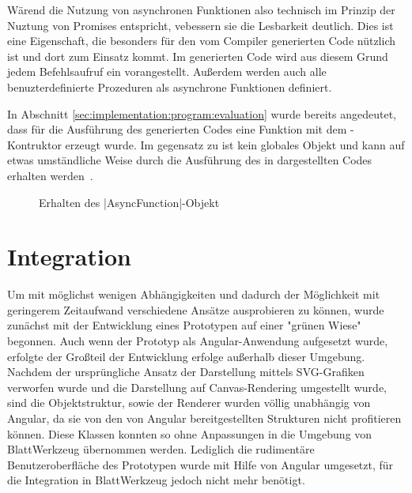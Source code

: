 Wärend die Nutzung von asynchronen Funktionen also technisch im Prinzip der Nuztung von Promises entspricht, vebessern sie die Lesbarkeit deutlich. Dies ist eine Eigenschaft, die besonders für den vom Compiler generierten Code  nützlich ist und dort zum Einsatz kommt. Im generierten Code wird aus diesem Grund jedem Befehlsaufruf ein  vorangestellt. Außerdem werden auch alle benuzterdefinierte Prozeduren als asynchrone Funktionen definiert.

In Abschnitt \ref{sec:implementation:program:evaluation} wurde bereits angedeutet, dass für die Ausführung des generierten Codes eine Funktion mit dem -Kontruktor erzeugt wurde. Im gegensatz zu  ist  kein globales Objekt und kann auf etwas umständliche Weise durch die Ausführung des in  dargestellten Codes erhalten werden~\cite{mdn-async-constructor}.


\begin{figure}
  
  \caption{Erhalten des \inlinec|AsyncFunction|-Objekt~\cite{mdn-async-constructor}}
  \label{fig:implementation:rendering:animation:async-function}
\end{figure}

\section{Integration}
\label{sec:implementation:integration}

Um mit möglichst wenigen Abhängigkeiten und dadurch der Möglichkeit mit geringerem Zeitaufwand verschiedene Ansätze ausprobieren zu können, wurde zunächst mit der Entwicklung eines Prototypen auf einer "grünen Wiese" begonnen. Auch wenn der Prototyp als Angular-Anwendung aufgesetzt wurde, erfolgte der Großteil der Entwicklung erfolge außerhalb dieser Umgebung. Nachdem der ursprüngliche Ansatz der Darstellung mittels SVG-Grafiken verworfen wurde und die Darstellung auf Canvas-Rendering umgestellt wurde, sind die Objektstruktur, sowie der Renderer wurden völlig unabhängig von Angular, da sie von den von Angular bereitgestellten Strukturen nicht profitieren können. Diese Klassen konnten so ohne Anpassungen in die Umgebung von BlattWerkzeug übernommen werden. Lediglich die rudimentäre Benutzeroberfläche des Prototypen  wurde mit Hilfe von Angular umgesetzt, für die Integration in BlattWerkzeug jedoch nicht mehr benötigt.

